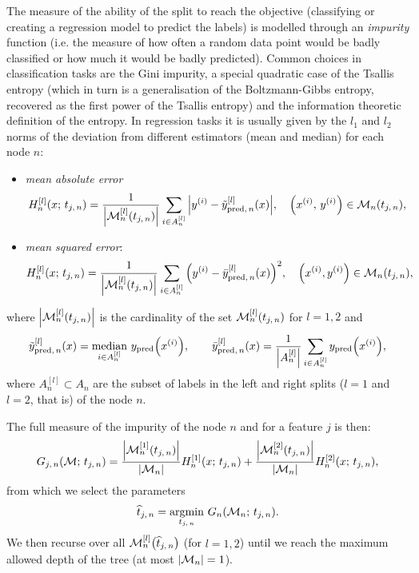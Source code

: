 The measure of the ability of the split to reach the objective (classifying or creating a regression model to predict the labels) is modelled through an \textit{impurity} function (i.e. the measure of how often a random data point would be badly classified or how much it would be badly predicted).
Common choices in classification tasks are the Gini impurity, a special quadratic case of the Tsallis entropy (which in turn is a generalisation of the Boltzmann-Gibbs entropy, recovered as the first power of the Tsallis entropy) and the information theoretic definition of the entropy.
In regression tasks it is usually given by the $l_1$ and $l_2$ norms of the deviation from different estimators (mean and median) for each node $n$:
\begin{itemize}
  \item \textit{mean absolute error}
  \begin{equation}
    H^{[l]}_n\qty(x;\, t_{j,\, n})
    =
    \frac{1}{\abs{\mathcal{M}^{[l]}_n( t_{j,\, n} )}} \sum\limits_{i \in A^{[l]}_n} \abs{y^{(i)} - \tilde{y}^{[l]}_{\text{pred},\, n}( x )},
    \quad
    \qty( x^{(i)},\, y^{(i)} ) \in \mathcal{M}_n\qty( t_{j,\, n} ),
  \end{equation}

  \item \textit{mean squared error}:
  \begin{equation}
  H^{[l]}_n\qty(x;\, t_{j,\, n})
  =
  \frac{1}{\abs{\mathcal{M}^{[l]}_n( t_{j,\, n} )}} \sum\limits_{i \in A^{[l]}_n} \qty( y^{(i)} - \bar{y}^{[l]}_{\text{pred},\, n}( x ) )^2,
  \quad
  \qty( x^{(i)}, y^{(i)} ) \in \mathcal{M}_n( t_{j,\, n} ),
  \end{equation}
\end{itemize}
where $\abs{\mathcal{M}^{[l]}_n\qty( t_{j,\, n} )}$ is the cardinality of the set $\mathcal{M}^{[l]}_n\qty( t_{j,\, n} )$ for $l = 1, 2$ and
\begin{equation}
  \tilde{y}^{[l]}_{\text{pred},\, n}( x )
  =
  \underset{i \in A^{[l]}_n}{\mathrm{median}}~ y_{\text{pred}}\qty(x^{(i)}),
  \qquad
  \bar{y}^{[l]}_{\text{pred},\, n}( x )
  =
  \frac{1}{\abs{A^{[l]}_n}} \sum\limits_{i \in A^{[l]}_n} y_{\text{pred}}\qty(x^{(i)}),
\end{equation}
where $A_n^{[l]} \subset A_n$ are the subset of labels in the left and right splits ($l = 1$ and $l = 2$, that is) of the node $n$.

The full measure of the impurity of the node $n$ and for a feature $j$ is then:
\begin{equation}
  G_{j,\, n}(\mathcal{M};\, t_{j,\, n})
  =
  \frac{\abs{\mathcal{M}_n^{[1]}( t_{j,\, n} )}}{\abs{\mathcal{M}_n}} H^{[1]}_n( x;\, t_{j,\, n} )
  +
  \frac{\abs{\mathcal{M}_n^{[2]}( t_{j,\, n} )}}{\abs{\mathcal{M}_n}} H^{[2]}_n( x;\, t_{j,\, n} ),
\end{equation}
from which we select the parameters
\begin{equation}
  \widehat{t}_{j,\, n}
  =
  \underset{t_{j,\, n}}{\mathrm{argmin}}~ G_n( \mathcal{M}_n;\, t_{j,\, n} ).
  \label{eq:trees:lossmin}
\end{equation}
We then recurse over all $\mathcal{M}_n^{[l]}\qty( \widehat{t}_{j,\, n} )$ (for $l = 1, 2$) until we reach the maximum allowed depth of the tree (at most $\abs{\mathcal{M}_n} = 1$).

